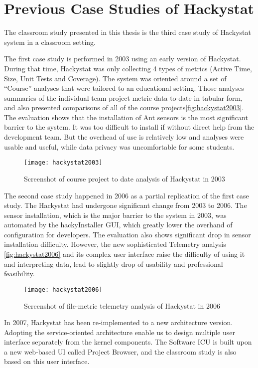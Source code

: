 \section {Previous Case Studies of Hackystat}
The classroom study presented in this thesis is the third case study of Hackystat system in a classroom setting. 

The first case study is performed in 2003 using an early version of Hackystat\cite{csdl2-03-13}. During that time, Hackystat was only collecting 4 types of metrics (Active Time, Size, Unit Tests and Coverage). The system was oriented around a set of ``Course'' analyses that were tailored to an educational setting. Those analyses summaries of the individual team project metric data to-date in tabular form, and also presented comparisons of all of the course projects\autoref{fig:hackystat2003}. The evaluation shows that the installation of Ant sensors is the most significant barrier to the system. It was too difficult to install if without direct help from the development team. But the overhead of use is relatively low and analyses were usable and useful, while data privacy was uncomfortable for some students.

\begin{figure}[htbp]
   \centering
   \texttt{[image: hackystat2003]} 
   \caption{Screenshot of course project to date analysis of Hackystat in 2003}
   \label{fig:hackystat2003}
\end{figure}

The second case study happened in 2006 as a partial replication of the first case study\cite{csdl2-07-02}. The Hackystat had undergone significant change from 2003 to 2006. The sensor installation, which is the major barrier to the system in 2003, was automated by the hackyInstaller GUI, which greatly lower the overhand of configuration for developers. The evaluation also shows significant drop in sensor installation difficulty. However, the new sophisticated Telemetry analysis \autoref{fig:hackystat2006} and its complex user interface raise the difficulty of using it and interpreting data, lead to slightly drop of usability and professional feasibility.

\begin{figure}[htbp]
   \centering
   \texttt{[image: hackystat2006]} 
   \caption{Screenshot of file-metric telemetry analysis of Hackystat in 2006}
   \label{fig:hackystat2006}
\end{figure}

In 2007, Hackystat has been re-implemented to a new architecture version. Adopting the service-oriented architecture enable us to design multiple user interface separately from the kernel components. The Software ICU is built upon a new web-based UI called Project Browser, and the classroom study is also based on this user interface.


